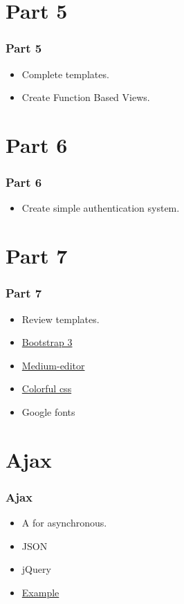\documentclass{beamer}
\begin{document}
\section{Part 5}
\begin{frame}
	\frametitle{Part 5}
	\begin{itemize}
		\item Complete templates.
		\item Create Function Based Views.
		
	\end{itemize}
\end{frame}


\section{Part 6}
\begin{frame}
	\frametitle{Part 6}
	\begin{itemize}
		\item Create simple authentication system.
		
	\end{itemize}
\end{frame}

\section{Part 7}
\begin{frame}[fragile]
	\frametitle{Part 7}
	\begin{itemize}
		\item Review templates.
		\item
		\href{https://getbootstrap.com/docs/3.3/getting-started/}{Bootstrap 3}
		
		\item
		\href{https://github.com/yabwe/medium-editor}{Medium-editor}
		
		\item
		\href{https://codepen.io/thapliyalshivam/pen/dvgXVO}{Colorful css}
		\item Google fonts
	\end{itemize}
\end{frame}


\section{Ajax}
\begin{frame}[fragile]
	\frametitle{Ajax}
	\begin{itemize}
		\item A for asynchronous.
		\item JSON
		\item jQuery
		\item
		\href{https://simpleisbetterthancomplex.com/tutorial/2016/08/29/how-to-work-with-ajax-request-with-django.html}{Example}
		
	\end{itemize}
\end{frame}
\end{document}

